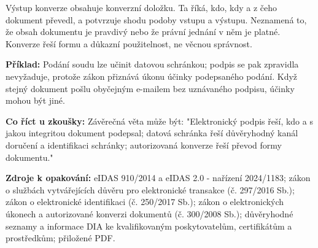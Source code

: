 \documentclass[11pt,a4paper]{article}
\newcommand{\zkouska}[1]{\begin{tcolorbox}[breakable,enhanced,colback=blue!7,colframe=blue!30!black,boxrule=0pt,arc=1mm,left=5pt,right=5pt,top=5pt,bottom=5pt,before skip=6pt,after skip=6pt]\textbf{Co říct u zkoušky:} #1\end{tcolorbox}}
\newcommand{\priklad}[1]{\begin{tcolorbox}[breakable,enhanced,colback=green!7,colframe=green!30!black,boxrule=0pt,arc=1mm,left=5pt,right=5pt,top=5pt,bottom=5pt,before skip=6pt,after skip=6pt]\textbf{Příklad:} #1\end{tcolorbox}}
\newcommand{\zdroje}[1]{\medskip\noindent\textbf{Zdroje k opakování:} #1\medskip}
\begin{document}
Výstup konverze obsahuje konverzní doložku. Ta říká, kdo, kdy a z čeho dokument převedl, a potvrzuje shodu podoby vstupu a výstupu. Neznamená to, že obsah dokumentu je pravdivý nebo že právní jednání v něm je platné. Konverze řeší formu a důkazní použitelnost, ne věcnou správnost.

\priklad{Podání soudu lze učinit datovou schránkou; podpis se pak zpravidla nevyžaduje, protože zákon přiznává úkonu účinky podepsaného podání. Když stejný dokument pošlu obyčejným e-mailem bez uznávaného podpisu, účinky mohou být jiné.}

\zkouska{Závěrečná věta může být: "Elektronický podpis řeší, kdo a s jakou integritou dokument podepsal; datová schránka řeší důvěryhodný kanál doručení a identifikaci schránky; autorizovaná konverze řeší převod formy dokumentu."}

\zdroje{eIDAS 910/2014 a eIDAS 2.0 - nařízení 2024/1183; zákon o službách vytvářejících důvěru pro elektronické transakce (č. 297/2016 Sb.); zákon o elektronické identifikaci (č. 250/2017 Sb.); zákon o elektronických úkonech a autorizované konverzi dokumentů (č. 300/2008 Sb.); důvěryhodné seznamy a informace DIA ke kvalifikovaným poskytovatelům, certifikátům a prostředkům; přiložené PDF.}

\fi

\newpage
\end{document}
